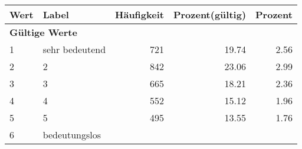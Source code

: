      \begin{longtable}{lXrrr}
     \toprule
     \textbf{Wert} & \textbf{Label} & \textbf{Häufigkeit} & \textbf{Prozent(gültig)} & \textbf{Prozent} \\
     \endhead
     \midrule
     \multicolumn{5}{l}{\textbf{Gültige Werte}}\\

     1 &
     \multicolumn{1}{X}{ sehr bedeutend   } &


       \num{721} &
       \num[round-mode=places,round-precision=2]{19,74} &
         \num[round-mode=places,round-precision=2]{2,56} \\

     2 &
     \multicolumn{1}{X}{ 2   } &


       \num{842} &
       \num[round-mode=places,round-precision=2]{23,06} &
         \num[round-mode=places,round-precision=2]{2,99} \\

     3 &
     \multicolumn{1}{X}{ 3   } &


       \num{665} &
       \num[round-mode=places,round-precision=2]{18,21} &
         \num[round-mode=places,round-precision=2]{2,36} \\

     4 &
     \multicolumn{1}{X}{ 4   } &


       \num{552} &
       \num[round-mode=places,round-precision=2]{15,12} &
         \num[round-mode=places,round-precision=2]{1,96} \\

     5 &
     \multicolumn{1}{X}{ 5   } &


       \num{495} &
       \num[round-mode=places,round-precision=2]{13,55} &
         \num[round-mode=places,round-precision=2]{1,76} \\

     6 &
     \multicolumn{1}{X}{ bedeutungslos   } &



\end{longtable}
